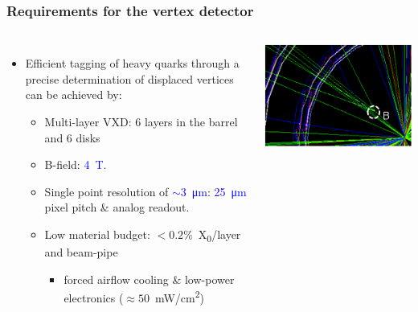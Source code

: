 \begin{frame}
  \frametitle{Requirements for the vertex detector}

  \begin{columns}
    \begin{itemize}
    \item Efficient tagging of heavy quarks through a precise
      determination of displaced vertices can be achieved by: 
      \begin{itemize}
      \item Multi-layer VXD: 6 layers in the barrel and 6 disks
      \item B-field: \textcolor{Blue}{4~T}.
      \item Single point resolution of
        \textcolor{Blue}{$\sim$\SI{3}{\micro\meter}}:
        \textcolor{Blue}{\SI{25}{\micro\meter}} pixel pitch \& analog readout.
      \item Low material budget: $<0.2\%$~X\textsubscript{0}/layer and beam-pipe
        \begin{itemize}
        \item forced airflow cooling \& low-power electronics
          ($\approx 50$~mW/cm\textsuperscript{2})
        \end{itemize}
      \end{itemize} 
    \end{itemize}

    \centering
    \includegraphics[width=\textwidth]{figures/secondary_vertex.png}

  \end{columns}


\end{frame}
